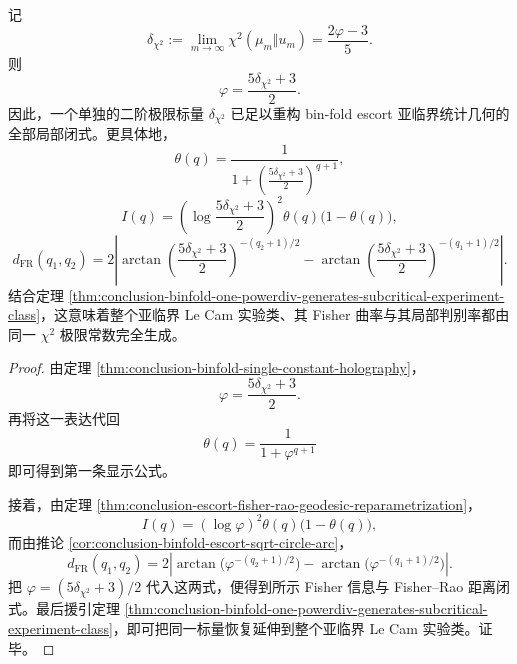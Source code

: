 \begin{theorem}\label{thm:conclusion-binfold-single-chi2-reconstructs-fisher-lecam-geometry}
记
\[
\delta_{\chi^2}:=\lim_{m\to\infty}\chi^2(\mu_m\Vert u_m)=\frac{2\varphi-3}{5}.
\]
则
\[
\varphi=\frac{5\delta_{\chi^2}+3}{2}.
\]
因此，一个单独的二阶极限标量 \(\delta_{\chi^2}\) 已足以重构 bin-fold escort 亚临界统计几何的全部局部闭式。更具体地，
\[
\theta(q)=\frac{1}{1+\left(\frac{5\delta_{\chi^2}+3}{2}\right)^{q+1}},
\]
\[
I(q)=
\left(\log\frac{5\delta_{\chi^2}+3}{2}\right)^2
\theta(q)\bigl(1-\theta(q)\bigr),
\]
\[
d_{\mathrm{FR}}(q_1,q_2)
=
2\left|
\arctan\!\left(\frac{5\delta_{\chi^2}+3}{2}\right)^{-(q_2+1)/2}
-
\arctan\!\left(\frac{5\delta_{\chi^2}+3}{2}\right)^{-(q_1+1)/2}
\right|.
\]
结合定理 \ref{thm:conclusion-binfold-one-powerdiv-generates-subcritical-experiment-class}，这意味着整个亚临界 Le Cam 实验类、其 Fisher 曲率与其局部判别率都由同一 \(\chi^2\) 极限常数完全生成。
\end{theorem}
\begin{proof}
由定理 \ref{thm:conclusion-binfold-single-constant-holography}，
\[
\varphi=\frac{5\delta_{\chi^2}+3}{2}.
\]
再将这一表达代回
\[
\theta(q)=\frac{1}{1+\varphi^{q+1}}
\]
即可得到第一条显示公式。

接着，由定理 \ref{thm:conclusion-escort-fisher-rao-geodesic-reparametrization}，
\[
I(q)=(\log\varphi)^2\theta(q)\bigl(1-\theta(q)\bigr),
\]
而由推论 \ref{cor:conclusion-binfold-escort-sqrt-circle-arc}，
\[
d_{\mathrm{FR}}(q_1,q_2)
=
2\left|
\arctan\!\bigl(\varphi^{-(q_2+1)/2}\bigr)
-
\arctan\!\bigl(\varphi^{-(q_1+1)/2}\bigr)
\right|.
\]
把 \(\varphi=(5\delta_{\chi^2}+3)/2\) 代入这两式，便得到所示 Fisher 信息与 Fisher--Rao 距离闭式。最后援引定理 \ref{thm:conclusion-binfold-one-powerdiv-generates-subcritical-experiment-class}，即可把同一标量恢复延伸到整个亚临界 Le Cam 实验类。证毕。
\end{proof}

